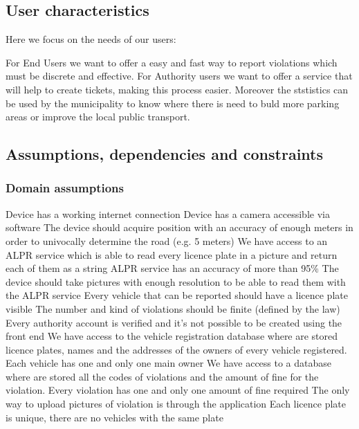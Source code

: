 \subsection{User characteristics}
Here we focus on the needs of our users:

For End Users we want to offer a easy and fast way to report violations which must be discrete and effective.
For Authority users we want to offer a service that will help to create tickets, making this process easier. Moreover the ststistics can be used by the municipality to know where there is need to buld more parking areas or improve the local public transport.

\subsection{Assumptions, dependencies and constraints}
\subsubsection{Domain assumptions}

\begin{enumerate}
 Device has a working internet connection
 Device has a camera accessible via software
 The device should acquire position with an accuracy of enough meters in order to univocally determine the road (e.g. 5 meters)
 We have access to an ALPR service which is able to read every licence plate in a picture and return each of them as a string
 ALPR service has an accuracy of more than 95\%
 The device should take pictures with enough resolution to be able to read them with the ALPR service
 Every vehicle that can be reported should have a licence plate visible
 The number and kind of violations should be finite (defined by the law)
 Every authority account is verified and it's not possible to be created using the front end
 We have access to the vehicle registration database where are stored licence plates, names and the addresses of the owners of every vehicle registered. Each vehicle has one and only one main owner
 We have access to a database where are stored all the codes of violations and the amount of fine for the violation. Every violation has one and only one amount of fine required
 The only way to upload pictures of violation is through the application
 Each licence plate is unique, there are no vehicles with the same plate

\end{enumerate}


